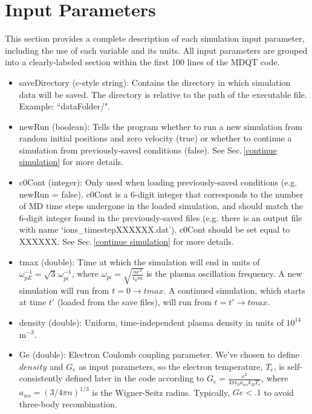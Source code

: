 \documentclass{article}
\begin{document}
	
	\section{Input Parameters} \label{input parameters}
	
	This section provides a complete description of each simulation input parameter, including the use of each variable and its units. All input parameters are grouped into a clearly-labeled section within the first 100 lines of the MDQT code.
	
	
	\begin{itemize}
		\item saveDirectory (c-style string): Contains the directory in which simulation data will be saved. The directory is relative to the path of the executable file. Example: ``dataFolder/".
				
		\item newRun (boolean): Tells the program whether to run a new simulation from random initial positions and zero velocity (true) or whether to continue a simulation from previously-saved conditions (false). See Sec.\,\ref{continue simulation} for more details.
		
		\item c0Cont (integer): Only used when loading previously-saved conditions (e.g. newRun = false). c0Cont is a 6-digit integer that corresponds to the number of MD time steps undergone in the loaded simulation, and should match the 6-digit integer found in the previously-saved files (e.g. there is an output file with name `ions\_timestepXXXXXX.dat'). c0Cont should be set equal to XXXXXX. See Sec.\,\ref{continue simulation} for more details.
		
		\item tmax (double): Time at which the simulation will end in units of $\omega_{pE}^{-1}=\sqrt{3}\,\omega_{pi}^{-1}$, where $\omega_{pi}=\sqrt{\frac{ne^2}{\epsilon_{0}m}}$ is the plasma oscillation frequency. A new simulation will run from $t=0 \rightarrow tmax$. A continued simulation, which starts at time $t'$ (loaded from the save files), will run from $t=t' \rightarrow tmax$.
		
		\item density (double): Uniform, time-independent plasma density in units of $10^{14}\,$m$^{-3}$.
		
		\item Ge (double): Electron Coulomb coupling parameter. We've chosen to define $density$ and $G_{e}$ as input parameters, so the electron temperature, $T_{e}$, is self-consistently defined later in the code according to $G_{e}=\frac{e^2}{4 \pi \epsilon_{0} a_{ws} k_{B} T_{e}}$, where 
		${a_{ws}=(3/4\pi n)^{1/3}}$ is the Wigner-Seitz radius. Typically, $Ge<.1$ to avoid three-body recombination.
		

\end{itemize}
\end{document}
